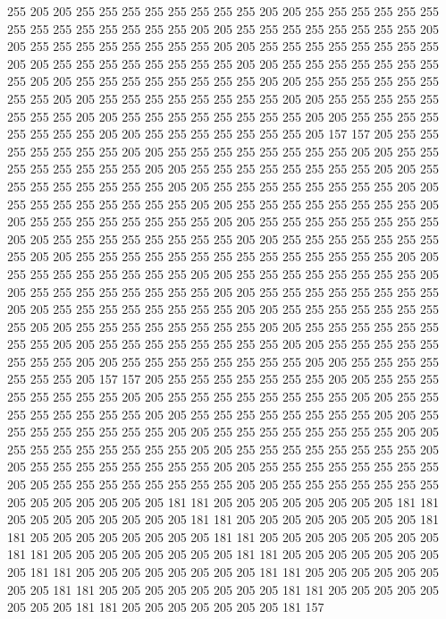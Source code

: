255 205 205 255 255 255 255 255 255 255 255 205 205 255 255 255 255 255 255 255
255 255 255 255 255 255 255 205 205 255 255 255 255 255 255 255 255 205 205 255
255 255 255 255 255 255 255 205 205 255 255 255 255 255 255 255 255 205 205 255
255 255 255 255 255 255 255 205 205 255 255 255 255 255 255 255 255 205 205 255
255 255 255 255 255 255 255 205 205 255 255 255 255 255 255 255 255 205 205 255
255 255 255 255 255 255 255 205 205 255 255 255 255 255 255 255 255 205 205 255
255 255 255 255 255 255 255 205 205 255 255 255 255 255 255 255 255 205 205 255
255 255 255 255 255 255 205 157 157 205 255 255 255 255 255 255 255 205 205 255
255 255 255 255 255 255 255 205 205 255 255 255 255 255 255 255 255 205 205 255
255 255 255 255 255 255 255 205 205 255 255 255 255 255 255 255 255 205 205 255
255 255 255 255 255 255 255 205 205 255 255 255 255 255 255 255 255 205 205 255
255 255 255 255 255 255 255 205 205 255 255 255 255 255 255 255 255 205 205 255
255 255 255 255 255 255 255 205 205 255 255 255 255 255 255 255 255 205 205 255
255 255 255 255 255 255 255 205 205 255 255 255 255 255 255 255 255 255 255 255
255 255 255 205 205 255 255 255 255 255 255 255 255 205 205 255 255 255 255 255
255 255 255 205 205 255 255 255 255 255 255 255 255 205 205 255 255 255 255 255
255 255 255 205 205 255 255 255 255 255 255 255 255 205 205 255 255 255 255 255
255 255 255 205 205 255 255 255 255 255 255 255 255 205 205 255 255 255 255 255
255 255 255 205 205 255 255 255 255 255 255 255 255 205 205 255 255 255 255 255
255 255 255 205 205 255 255 255 255 255 255 255 255 205 205 255 255 255 255 255
255 255 205 157 157 205 255 255 255 255 255 255 255 205 205 255 255 255 255 255
255 255 255 205 205 255 255 255 255 255 255 255 255 205 205 255 255 255 255 255
255 255 255 205 205 255 255 255 255 255 255 255 255 205 205 255 255 255 255 255
255 255 255 205 205 255 255 255 255 255 255 255 255 205 205 255 255 255 255 255
255 255 255 205 205 255 255 255 255 255 255 255 255 205 205 255 255 255 255 255
255 255 255 205 205 255 255 255 255 255 255 255 255 205 205 255 255 255 255 255
255 255 255 205 205 255 255 255 255 255 255 255 205 205 205 205 205 205 205 181
181 205 205 205 205 205 205 205 205 181 181 205 205 205 205 205 205 205 205 181
181 205 205 205 205 205 205 205 205 181 181 205 205 205 205 205 205 205 205 181
181 205 205 205 205 205 205 205 205 181 181 205 205 205 205 205 205 205 205 181
181 205 205 205 205 205 205 205 205 181 181 205 205 205 205 205 205 205 205 181
181 205 205 205 205 205 205 205 205 181 181 205 205 205 205 205 205 205 205 181
181 205 205 205 205 205 205 205 205 181 181 205 205 205 205 205 205 205 181 157
